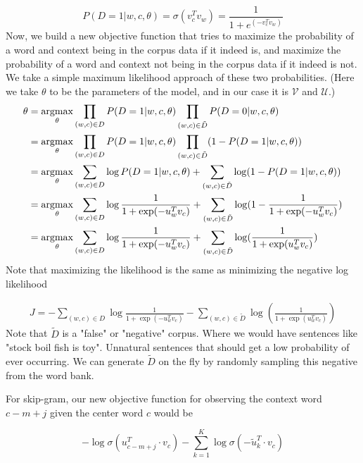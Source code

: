 \documentclass[nobib]{tufte-handout}
\newcommand{\argmax}{\operatornamewithlimits{argmax}}
\begin{document}
$$ P(D = 1|w, c, \theta) = \sigma (v_c^T v_w) = \frac{1}{1+ e^{(-v_c^Tv_w)}}$$
Now, we build a new objective function that tries to maximize the probability of a word and context being in the corpus data if it indeed is, and maximize the probability of a word and context not being in the corpus data if it indeed is not. We take a simple maximum likelihood approach of these two probabilities. (Here we take $\theta$ to be the parameters of the model, and in our case it is $\mathcal{V}$ and $\mathcal{U}$.)
\begin{align*}
\theta &= \argmax_{\theta} \prod_{(w,c) \in D} P(D = 1|w, c, \theta) \prod_{(w,c) \in \tilde{D}} P(D = 0|w, c, \theta) \\
&= \argmax_{\theta} \prod_{(w,c) \in D} P(D = 1|w, c, \theta) \prod_{(w,c) \in \tilde{D}} (1 - P(D = 1|w, c, \theta))\\
&= \argmax_{\theta} \sum_{(w,c) \in D} \log P(D = 1|w, c, \theta) + \sum_{(w,c) \in \tilde{D}} \log(1 - P(D = 1|w, c, \theta))\\
&= \argmax_{\theta} \sum_{(w,c) \in D} \log \frac{1}{1 + \exp(-u_w^Tv_c)} + \sum_{(w,c) \in \tilde{D}} \log(1 - \frac{1}{1 + \exp(-u_w^Tv_c)} )\\
&= \argmax_{\theta} \sum_{(w,c) \in D} \log \frac{1}{1 + \exp(-u_w^Tv_c)} + \sum_{(w,c) \in \tilde{D}} \log(\frac{1}{1 + \exp(u_w^Tv_c)} )\\
\end{align*}
Note that maximizing the likelihood is the same as minimizing the negative log likelihood

\begin{align*}
J = - \sum_{(w,c) \in D} \log \frac{1}{1 + \exp(-u_w^Tv_c)} - \sum_{(w,c) \in \tilde{D}} \log(\frac{1}{1 + \exp(u_w^Tv_c)} )
\end{align*}
Note that $\tilde{D}$ is a "false" or "negative" corpus. Where we would have sentences like "stock boil fish is toy". Unnatural sentences that should get a low probability of ever occurring. We can generate $\tilde{D}$ on the fly by randomly sampling this negative from the word bank. 

For skip-gram, our new objective function for observing the context word $ c-m+j$ given the center word $ c $ would be 


$$ - \log \sigma (u_{c-m+j}^{T}\cdot v_{c}) -\sum_{k = 1}^K \log \sigma (- \tilde{u}_{k}^{T}\cdot v_{c}) $$

\end{document}
